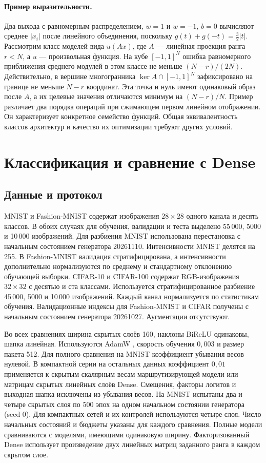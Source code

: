 \documentclass[11pt,a4paper]{article}
\begin{document}
\paragraph{Пример выразительности.} Два выхода с равномерным распределением, $w=1$ и $w=-1$, $b=0$ вычисляют среднее $|x_i|$ после линейного объединения, поскольку $g(t)+g(-t)=\tfrac32|t|$. Рассмотрим класс моделей вида $u(Ax)$, где $A$ — линейная проекция ранга $r<N$, а $u$ — произвольная функция. На кубе $[-1,1]^N$ ошибка равномерного приближения среднего модулей в этом классе не меньше $(N-r)/(2N)$. Действительно, в вершине многогранника $\ker A\cap[-1,1]^N$ зафиксировано на границе не меньше $N-r$ координат. Эта точка и нуль имеют одинаковый образ после $A$, а их целевые значения отличаются минимум на $(N-r)/N$. Пример различает два порядка операций при сжимающем первом линейном отображении. Он характеризует конкретное семейство функций. Общая эквивалентность классов архитектур и качество их оптимизации требуют других условий.

\section{Классификация и сравнение с Dense}
\subsection{Данные и протокол}
\label{sec:data}
MNIST \cite{lecun1998} и Fashion-MNIST \cite{xiao2017} содержат изображения $28\times28$ одного канала и десять классов. В обоих случаях для обучения, валидации и теста выделено 55\,000, 5000 и 10\,000 изображений. Для разбиения MNIST использована перестановка с начальным состоянием генератора 20261110. Интенсивности MNIST делятся на 255. В Fashion-MNIST валидация стратифицирована, а интенсивности дополнительно нормализуются по среднему и стандартному отклонению обучающей выборки. CIFAR-10 и CIFAR-100 \cite{cifar} содержат RGB-изображения $32\times32$ с десятью и ста классами. Используется стратифицированное разбиение 45\,000, 5000 и 10\,000 изображений. Каждый канал нормализуется по статистикам обучения. Валидационные индексы для Fashion-MNIST и CIFAR получены с начальным состоянием генератора 20261027. Аугментации отсутствуют.

Во всех сравнениях ширина скрытых слоёв 160, наклоны BiReLU одинаковы, шапка линейная. Используются AdamW \cite{loshchilov2019}, скорость обучения $0{,}003$ и размер пакета 512. Для полного сравнения на MNIST коэффициент убывания весов нулевой. В компактной серии на остальных данных коэффициент $0{,}01$ применяется к скрытым скалярным весам маршрутизирующей модели или матрицам скрытых линейных слоёв Dense. Смещения, факторы логитов и выходная шапка исключены из убывания весов. На MNIST испытаны два и четыре скрытых слоя по 500 эпох на одном начальном состоянии генератора (seed 0). Для компактных сетей и их контролей используются четыре слоя. Число начальных состояний и бюджеты указаны для каждого сравнения. Полные модели сравниваются с моделями, имеющими одинаковую ширину. Факторизованный Dense использует произведение двух линейных матриц заданного ранга в каждом скрытом слое.
\end{document}
